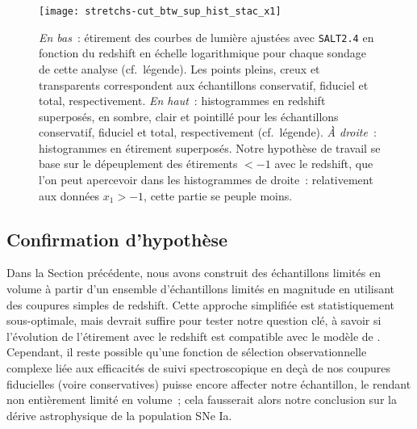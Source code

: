 \documentclass[../main/main.tex]{subfiles}
\begin{document}
\begin{figure}
    \centering
    \texttt{[image: stretchs-cut\_btw\_sup\_hist\_stac\_x1]}
    \caption[Présentation des données d'étirement en fonction du redshift pour
    l'échantillon complet]{\textit{En bas}~: étirement des courbes de lumière
        ajustées avec \textsc{\texttt{SALT2.4}} en fonction du redshift en
        échelle logarithmique pour chaque sondage de cette analyse (cf.\
        légende). Les points pleins, creux et transparents correspondent aux
        échantillons conservatif, fiduciel et total, respectivement. \textit{En
        haut}~: histogrammes en redshift superposés, en sombre, clair et
        pointillé pour les échantillons conservatif, fiduciel et total,
        respectivement (cf.\ légende). \textit{À droite}~: histogrammes en
        étirement superposés. Notre hypothèse de travail se base sur le
        dépeuplement des étirements $< -1$ avec le redshift, que l'on peut
        apercevoir dans les histogrammes de droite~: relativement aux données
    $x_1 > -1$, cette partie se peuple moins.}\label{fig:sample}
\end{figure}

\subsection{Confirmation d'hypothèse}\label{ssec:testvl}

% 

Dans la Section précédente, nous avons construit des échantillons limités en
volume à partir d'un ensemble d'échantillons limités en magnitude en utilisant
des coupures simples de redshift. Cette approche simplifiée est
statistiquement sous-optimale, mais devrait suffire pour tester notre question
clé, à savoir si l'évolution de l'étirement avec le redshift est compatible avec le
modèle de \cite{rigault2020}. Cependant, il reste possible qu'une fonction de
sélection observationnelle complexe liée aux efficacités de suivi
spectroscopique en deçà de nos coupures fiducielles (voire conservatives) puisse
encore affecter notre échantillon, le rendant non entièrement limité en volume~;
cela fausserait alors notre conclusion sur la dérive astrophysique de la
population SNe Ia.
\end{document}
